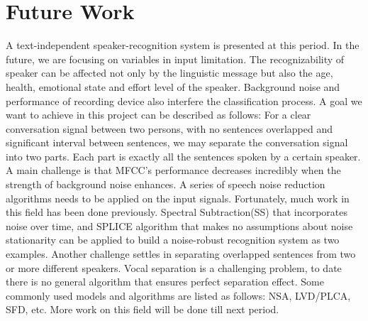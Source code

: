 \section{Future Work}
A text-independent speaker-recognition system is presented at this period.
In the future, we are focusing on variables in input limitation. The
recognizability of speaker can be affected not only by the linguistic message
but also the age, health, emotional state and effort level of the speaker.
Background noise and performance of recording device also interfere the
classification process.
A goal we want to achieve in this project can be described as follows: For a clear conversation signal between two persons, with no sentences overlapped and significant interval between sentences, we may separate the conversation signal into two parts. Each part is exactly all the sentences spoken by a certain speaker.
A main challenge is that MFCC's performance decreases incredibly when the strength of background noise enhances.  A series of speech noise reduction algorithms needs to be applied on the input signals. Fortunately, much work in this field has been done previously. Spectral Subtraction(SS) that incorporates noise over time, and SPLICE algorithm that makes no assumptions about noise stationarity can be applied to build a noise-robust recognition system as two examples.
Another challenge settles in separating overlapped sentences from two or more different speakers. Vocal separation is a challenging problem, to date there is no general algorithm that ensures perfect separation effect. Some commonly used models and algorithms are listed as follows: NSA, LVD/PLCA, SFD, etc. More work on this field will be done till next period.
